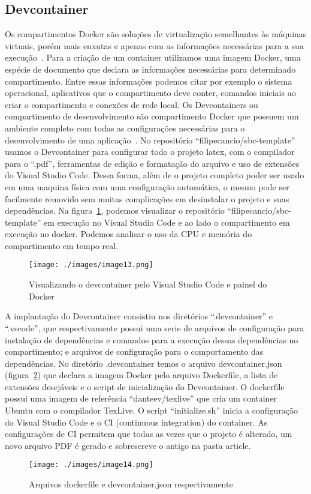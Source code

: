 

\subsection{Devcontainer}
Os compartimentos Docker são soluções de virtualização semelhantes às máquinas virtuais, porém mais enxutas e apenas com as informações necessárias para a sua execução~\cite{vitalino:01}. Para a criação de um container utilizamos uma imagem Docker, uma espécie de documento que declara as informações necessárias para determinado compartimento. Entre essas informações podemos citar por exemplo o sistema operacional, aplicativos que o compartimento deve conter, comandos iniciais ao criar o compartimento e conexões de rede local.
Os Devcontainers ou compartimento de desenvolvimento são compartimento Docker que possuem um ambiente completo com todas as configurações necessárias para o desenvolvimento de uma aplicação~\cite{github:01}. No repositório ``filipecancio/sbc-template'' usamos o Devcontainer para configurar todo o projeto latex, com o compilador para o ``.pdf'', ferramentas de edição e formatação do arquivo e uso de extensões do Visual Studio Code. Dessa forma, além de o projeto completo poder ser usado em uma maquina física com uma configuração automática, o mesmo pode ser facilmente removido sem muitas complicações em desinstalar o projeto e suas dependências.
Na figura~\ref{fig:image13}, podemos visualizar o repositório ``filipecancio/sbc-template'' em execução no Visual Studio Code e ao lado o compartimento em execução no docker. Podemos analisar o uso da CPU e memória do compartimento em tempo real.

\begin{figure}[ht]
	\centering
	\texttt{[image: ./images/image13.png]}
	\caption{Visualizando o devcontainer pelo Visual Studio Code e painel do Docker}
	\label{fig:image13}
\end{figure}

A implantação do Devcontainer consistiu nos diretórios ``.devcontainer'' e ``.vscode'', que respectivamente possui uma serie de arquivos de configuração para instalação de dependências e comandos para a execução dessas dependências no compartimento; e arquivos de configuração para o comportamento das dependências.
No diretório .devcontainer temos o arquivo devcontainer.json (figura~\ref{fig:image14}) que declara a imagem Docker pelo arquivo Dockerfile, a lista de extensões desejáveis e o script de inicialização do Devcontainer. O dockerfile possui uma imagem de referência ``danteev/texlive'' que cria um container Ubuntu com o compilador TexLive. O script ``initialize.sh'' inicia a configuração do Visual Studio Code e o CI (continuous integration) do container. As configurações de CI permitem que todas as vezes que o projeto é alterado, um novo arquivo PDF é gerado e sobrescreve o antigo na pasta article.

\begin{figure}[ht]
	\centering
	\texttt{[image: ./images/image14.png]}
	\caption{Arquivos dockerfile e devcontainer.json respectivamente}
	\label{fig:image14}
\end{figure}


